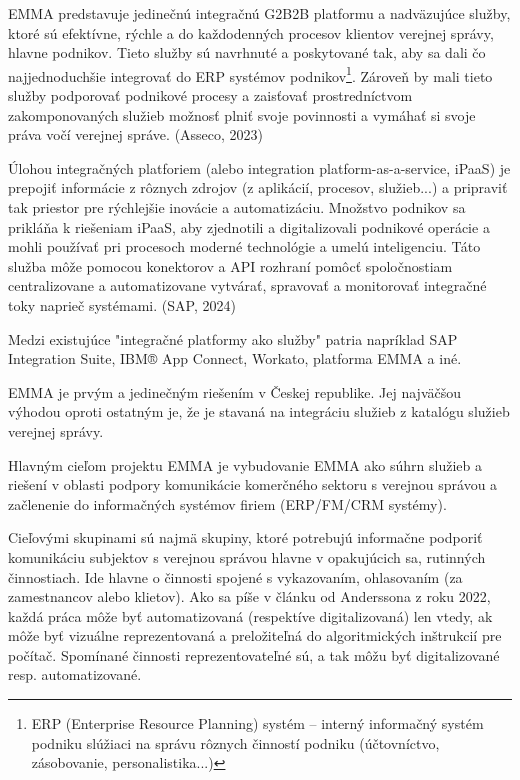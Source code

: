 


EMMA predstavuje jedinečnú integračnú G2B2B platformu a nadväzujúce služby, ktoré sú efektívne, rýchle a  do každodenných procesov klientov verejnej správy, hlavne podnikov. Tieto služby sú navrhnuté a poskytované tak, aby sa dali čo najjednoduchšie integrovať do ERP systémov podnikov\footnote{ERP (Enterprise Resource Planning) systém -- interný informačný systém podniku slúžiaci na správu rôznych činností podniku (účtovníctvo, zásobovanie, personalistika...)}. Zároveň by mali tieto služby podporovať podnikové procesy a zaisťovať prostredníctvom zakomponovaných služieb možnosť plniť svoje povinnosti a vymáhať si svoje práva vočí verejnej správe. \scr(Asseco, 2023)

Úlohou integračných platforiem (alebo integration platform-as-a-service, \zlom iPaaS) je prepojiť informácie z rôznych zdrojov (z aplikácií, procesov, služieb...) a pripraviť tak priestor pre rýchlejšie inovácie a automatizáciu. Množstvo podnikov sa prikláňa k riešeniam iPaaS, aby zjednotili a digitalizovali podnikové operácie a mohli používať pri procesoch moderné technológie a umelú inteligenciu. Táto služba môže pomocou konektorov a API rozhraní pomôcť spoločnostiam centralizovane a automatizovane vytvárať, spravovať a monitorovať integračné toky naprieč systémami. \scr(SAP, 2024)

Medzi existujúce "integračné platformy ako služby" patria napríklad SAP Integration Suite, IBM® App Connect, Workato, platforma EMMA a iné.

EMMA je prvým a jedinečným riešením v Českej republike. Jej najväčšou výhodou oproti ostatným je, že je stavaná na integráciu služieb z katalógu služieb verejnej správy.

Hlavným cieľom projektu EMMA je vybudovanie EMMA ako súhrn služieb a riešení v oblasti podpory komunikácie komerčného sektoru s verejnou správou a začlenenie do informačných systémov firiem (ERP/FM/CRM systémy).

Cieľovými skupinami sú najmä skupiny, ktoré potrebujú informačne podporiť komunikáciu subjektov s verejnou správou hlavne v opakujúcich sa, rutinných činnostiach.  Ide hlavne o činnosti spojené s vykazovaním, ohlasovaním (za zamestnancov alebo klietov). Ako sa píše v článku od Anderssona z roku 2022, každá práca môže byť automatizovaná (respektíve digitalizovaná) len vtedy, ak môže byť vizuálne reprezentovaná a preložiteľná do algoritmických inštrukcií pre počítač. Spomínané činnosti reprezentovateľné sú, a tak môžu byť digitalizované resp. automatizované.

